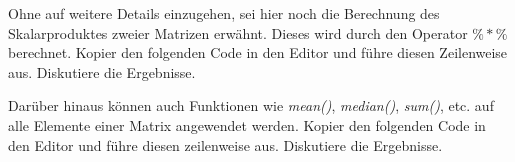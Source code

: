 \documentclass[]{article}
\newenvironment{Shaded}{\begin{snugshade}}{\end{snugshade}}
\newcommand{\KeywordTok}[1]{\textcolor[rgb]{0.13,0.29,0.53}{\textbf{#1}}}
\newcommand{\DataTypeTok}[1]{\textcolor[rgb]{0.13,0.29,0.53}{#1}}
\newcommand{\DecValTok}[1]{\textcolor[rgb]{0.00,0.00,0.81}{#1}}
\newcommand{\StringTok}[1]{\textcolor[rgb]{0.31,0.60,0.02}{#1}}
\newcommand{\CommentTok}[1]{\textcolor[rgb]{0.56,0.35,0.01}{\textit{#1}}}
\newcommand{\OperatorTok}[1]{\textcolor[rgb]{0.81,0.36,0.00}{\textbf{#1}}}
\newcommand{\NormalTok}[1]{#1}
\begin{document}
Ohne auf weitere Details einzugehen, sei hier noch die Berechnung des
Skalarproduktes zweier Matrizen erwähnt. Dieses wird durch den Operator
\(\%*\%\) berechnet. Kopier den folgenden Code in den Editor und führe
diesen Zeilenweise aus. Diskutiere die Ergebnisse.

\begin{Shaded}
\end{Shaded}

Darüber hinaus können auch Funktionen wie \emph{mean()},
\emph{median()}, \emph{sum()}, etc. auf alle Elemente einer Matrix
angewendet werden. Kopier den folgenden Code in den Editor und führe
diesen zeilenweise aus. Diskutiere die Ergebnisse.
\end{document}
